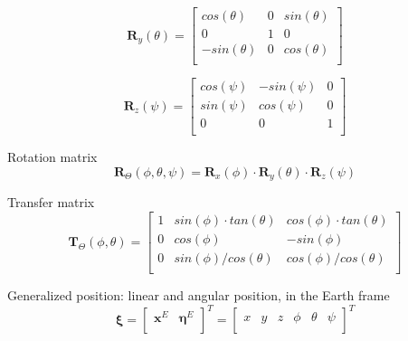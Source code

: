 \documentclass[journal]{IEEEtran}
\begin{document}
	
	\begin{equation} \label{eq:roty}
	\textbf{R}_y (\theta)=
	\left[ {\begin{array}{ccc}
		cos(\theta) & 0 & sin(\theta) \\
		0 & 1 & 0 \\
		-sin(\theta) &  0 & cos(\theta) \\ 
		\end{array} } \right]
	 \end{equation}  
	
	\begin{equation} \label{eq:rotz}
	\textbf{R}_z (\psi)=
	\left[ {\begin{array}{ccc}
		cos(\psi) & -sin(\psi) & 0 \\
		sin(\psi) & cos(\psi) & 0 \\
		0 &  0 & 1 \\ 
		\end{array} } \right]
	 \end{equation}  
	 
	Rotation matrix
	\begin{equation} \label{eq:rot}
		\textbf{R}_\Theta (\phi, \theta, \psi) = 	\textbf{R}_x (\phi) \cdot \textbf{R}_y (\theta) \cdot \textbf{R}_z (\psi)
	\end{equation}  
	
	Transfer matrix
	\begin{equation} \label{eq:transf}
		\textbf{T}_\Theta (\phi,\theta )= \left[ {\begin{array}{ccc}
		1 & sin(\phi) \cdot tan(\theta) & cos(\phi) \cdot tan(\theta) \\
		0 & cos(\phi) & -sin(\phi) \\
		0 &  sin(\phi)/cos(\theta) & cos(\phi)/cos(\theta)  \\ 
		\end{array} } \right]
	\end{equation}  
	
	Generalized position: linear and angular position, in the Earth frame
	\begin{equation} \label{eq:pos}
		\bm{\xi} = \left[ \begin{array}{cc}
		\bm{x}^E & \bm{\eta}^E \\
		\end{array}\right]^T = \left[ \begin{array}{cccccc}
			x & y & z & \phi & \theta & \psi\\
		\end{array}\right] ^T
	\end{equation}  
	
\end{document}
